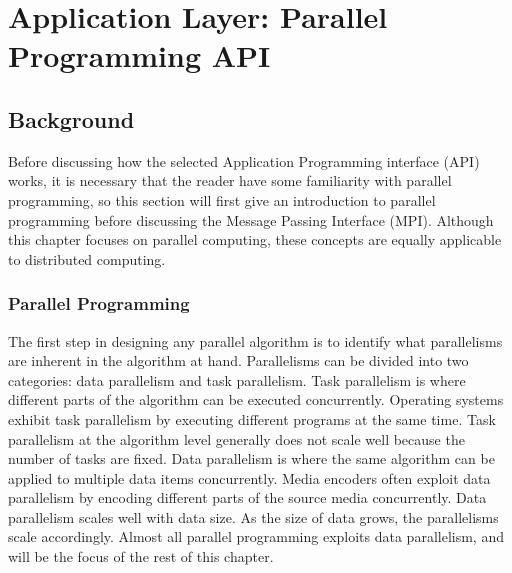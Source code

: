 \chapter{Application Layer: Parallel Programming API} \label{sec:api}

\section{Background}\label{sec:api:background}

Before discussing how the selected Application Programming interface (API) works, it is necessary that the reader have some familiarity with parallel programming, so this section will first give an introduction to parallel programming before discussing the Message Passing Interface (MPI). Although this chapter focuses on parallel computing, these concepts are equally applicable to distributed computing.

\subsection{Parallel Programming}\label{sec:api:background:parallel_computing}

The first step in designing any parallel algorithm is to identify what parallelisms are inherent in the algorithm at hand. Parallelisms can be divided into two categories: data parallelism and task parallelism. Task parallelism is where different parts of the algorithm can be executed concurrently. Operating systems exhibit task parallelism by executing different programs at the same time. Task parallelism at the algorithm level generally does not scale well because the number of tasks are fixed. Data parallelism is where the same algorithm can be applied to multiple data items concurrently. Media encoders often exploit data parallelism by encoding different parts of the source media concurrently. Data parallelism scales well with data size. As the size of data grows, the parallelisms scale accordingly. Almost all parallel programming exploits data parallelism, and will be the focus of the rest of this chapter. \cite{ref:2009-snyder-principles_of_parallel_programming}


